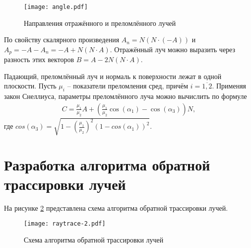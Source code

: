 \begin{figure}[h!]
    \centering
    \texttt{[image: angle.pdf]}
    \caption{Направления отражённого и преломлённого лучей}
    \label{img:angle}
\end{figure}

%
%

По свойству скалярного произведения $A_n = N(N \cdot (-A))$ и  $A_p = -A - A_n = -A + N(N \cdot A)$.
Отражённый луч можно выразить через разность этих векторов $B = A - 2 N(N \cdot A)$.

Падающий, преломлённый луч и нормаль к поверхности лежат в одной плоскости. Пусть $ \mu_i$ -- показатели преломления сред, причём $i = \overline{1,2}$. 
Применяя закон Снеллиуса, параметры преломлённого луча можно вычислить по формуле
\begin{equation}
\begin{aligned}
C = \frac{\mu_1}{\mu_2}A + ( \frac{\mu_1}{\mu_2}\cos(\alpha_1) - \cos(\alpha_3))N ,
\end{aligned}
\end{equation} 
где $cos(\alpha_3) = \sqrt{1 - (\frac{\mu_1}{\mu_2})^2(1 - cos(\alpha_1))^2}$.

\section{Разработка алгоритма обратной трассировки лучей}
На рисунке \ref{img:raytrace} представлена схема алгоритма обратной трассировки лучей.

\begin{figure}[h!]
    \centering
    \texttt{[image: raytrace-2.pdf]}
    \caption{Схема алгоритма обратной трассировки лучей}
    \label{img:raytrace}
\end{figure}

